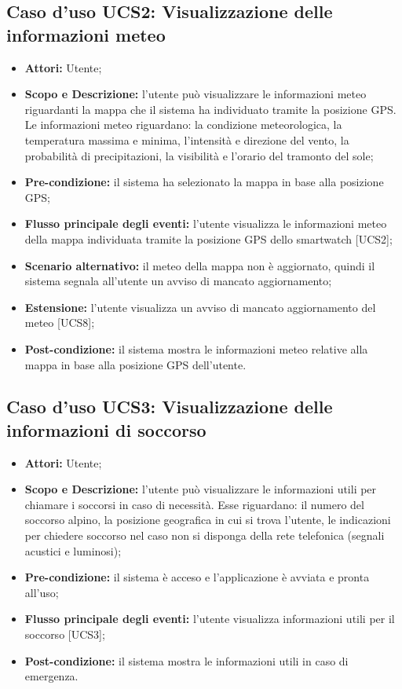 \subsection{Caso d'uso UCS2: Visualizzazione delle informazioni meteo}
\begin{itemize}
\item \textbf{Attori:} Utente;
\item \textbf{Scopo e Descrizione:} l'utente può visualizzare le informazioni meteo riguardanti la mappa che il sistema ha individuato tramite la posizione GPS. Le informazioni meteo riguardano: la condizione meteorologica, la temperatura massima e minima, l'intensità e direzione del vento, la probabilità di precipitazioni, la visibilità e l'orario del tramonto del sole;
\item \textbf{Pre-condizione:} il sistema ha selezionato la mappa in base alla posizione GPS;
\item \textbf{Flusso principale degli eventi:} l'utente visualizza le informazioni meteo della mappa individuata tramite la posizione GPS dello smartwatch [UCS2];
\item \textbf{Scenario alternativo:} il meteo della mappa non è aggiornato, quindi il sistema segnala all'utente un avviso di mancato aggiornamento;
\item \textbf{Estensione:} l'utente visualizza un avviso di mancato aggiornamento del meteo [UCS8];
\item \textbf{Post-condizione:} il sistema mostra le informazioni meteo relative alla mappa in base alla posizione GPS dell'utente.
\end{itemize}

\subsection{Caso d'uso UCS3: Visualizzazione delle informazioni di soccorso}
\begin{itemize}
\item \textbf{Attori:} Utente;
\item \textbf{Scopo e Descrizione:} l'utente può visualizzare le informazioni utili per chiamare i soccorsi in caso di necessità. Esse riguardano: il numero del soccorso alpino, la posizione geografica in cui si trova l'utente, le indicazioni per chiedere soccorso nel caso non si disponga della rete telefonica (segnali acustici e luminosi);
\item \textbf{Pre-condizione:} il sistema è acceso e l'applicazione è avviata e pronta all'uso;
\item \textbf{Flusso principale degli eventi:} l'utente visualizza informazioni utili per il soccorso [UCS3];
\item \textbf{Post-condizione:} il sistema mostra le informazioni utili in caso di emergenza.
\end{itemize}

